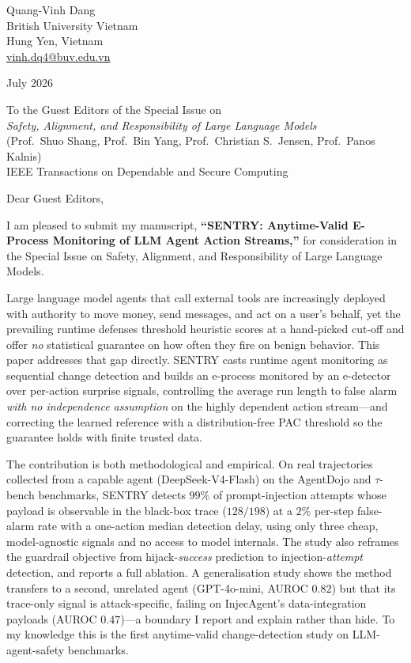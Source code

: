 \documentclass[11pt]{article}
\begin{document}
\noindent
Quang-Vinh Dang\\
British University Vietnam\\
Hung Yen, Vietnam\\
\href{mailto:vinh.dq4@buv.edu.vn}{vinh.dq4@buv.edu.vn}

\vspace{1em}
 July 2026

\vspace{1em}
\noindent
To the Guest Editors of the Special Issue on\\
\emph{Safety, Alignment, and Responsibility of Large Language Models}\\
(Prof.\ Shuo Shang, Prof.\ Bin Yang, Prof.\ Christian S.\ Jensen, Prof.\ Panos Kalnis)\\
IEEE Transactions on Dependable and Secure Computing

\vspace{1.2em}
\noindent Dear Guest Editors,

\vspace{0.6em}
I am pleased to submit my manuscript, \textbf{``SENTRY: Anytime-Valid E-Process
Monitoring of LLM Agent Action Streams,''} for consideration in the Special
Issue on Safety, Alignment, and Responsibility of Large Language Models.

Large language model agents that call external tools are increasingly deployed
with authority to move money, send messages, and act on a user's behalf, yet
the prevailing runtime defenses threshold heuristic scores at a hand-picked
cut-off and offer \emph{no} statistical guarantee on how often they fire on
benign behavior. This paper addresses that gap directly. SENTRY casts runtime
agent monitoring as sequential change detection and builds an e-process
monitored by an e-detector over per-action surprise signals, controlling the
average run length to false alarm \emph{with no independence assumption} on the
highly dependent action stream---and correcting the learned reference with a
distribution-free PAC threshold so the guarantee holds with finite trusted
data.

The contribution is both methodological and empirical. On real trajectories
collected from a capable agent (DeepSeek-V4-Flash) on the AgentDojo and
$\tau$-bench benchmarks, SENTRY detects $99\%$ of prompt-injection attempts
whose payload is observable in the black-box trace ($128/198$) at a $2\%$
per-step false-alarm rate with a one-action median detection delay, using only
three cheap, model-agnostic signals and no access to model internals. The study
also reframes the guardrail objective from hijack-\emph{success} prediction to
injection-\emph{attempt} detection, and reports a full ablation. A
generalisation study shows the method transfers to a second, unrelated agent
(GPT-4o-mini, AUROC $0.82$) but that its trace-only signal is attack-specific,
failing on InjecAgent's data-integration payloads (AUROC $0.47$)---a boundary I
report and explain rather than hide. To my knowledge this is the first
anytime-valid change-detection study on LLM-agent-safety benchmarks.
\end{document}
